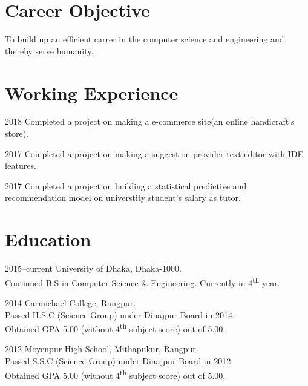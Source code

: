 \documentclass[a4paper]{article}
\begin{document}
\section{Career Objective}
\begin{CV}
\item To build up an efficient carrer in the computer science and engineering and thereby serve humanity.
  \end{CV}

\section{Working Experience}

\begin{CV}

\item[2018] Completed a project on making a e-commerce site(an online handicraft's store).
\item[2017] Completed a project on making a suggestion provider text editor with IDE features.
\item[2017] Completed a project on building a statistical predictive and recommendation model on universtity student's salary as tutor.
\end{CV}


\section{Education}

\begin{CV}
\item[2015--current] University of Dhaka, Dhaka-1000.\\Continued  B.S in Computer Science \& Engineering. Currently in 4\textsuperscript{th} year.
\item[2014] Carmichael College, Rangpur.\\Passed H.S.C (Science Group) under Dinajpur Board in 2014.\\Obtained GPA 5.00 (without 4\textsuperscript{th} subject score) out of 5.00.
\item[2012] Moyenpur High School, Mithapukur, Rangpur.\\Passed S.S.C (Science Group) under Dinajpur Board in 2012.\\Obtained GPA 5.00 (without 4\textsuperscript{th} subject score) out of 5.00.
\end{CV}


\end{document}
